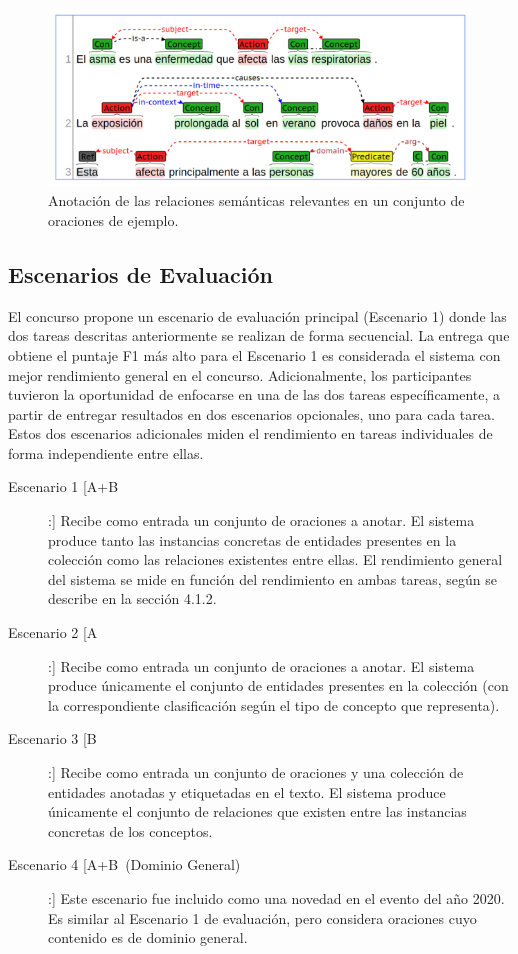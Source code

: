 \begin{figure}[h!]
	\centering
	\includegraphics[width=0.9\linewidth]{Graphics/relations.png}
	\caption{Anotación de las relaciones semánticas relevantes en un conjunto de oraciones de ejemplo.} \label{fig:relations_ex}
\end{figure}


\subsection{Escenarios de Evaluación}\label{subsec:eval_sce}

El concurso propone un escenario de evaluación principal (Escenario 1) donde las dos tareas descritas anteriormente se realizan de forma secuencial.
La entrega que obtiene el puntaje F1 más alto para el Escenario 1 es
considerada el sistema con mejor rendimiento general en el concurso.
Adicionalmente, los participantes tuvieron la oportunidad de enfocarse en una de las dos tareas específicamente, a partir de entregar resultados en dos escenarios opcionales, uno para cada tarea.
Estos dos escenarios adicionales miden el rendimiento en tareas individuales de forma independiente entre ellas.

\begin{description}
	
\item[Escenario 1 [A+B]:] Recibe como entrada un conjunto de oraciones a anotar.
El sistema produce tanto las instancias concretas de entidades
presentes en la colección como las relaciones existentes entre ellas.
El rendimiento general del sistema se mide en función
del rendimiento en ambas tareas, según se describe en la sección 4.1.2.
 
\item[Escenario 2 [A]:] Recibe como entrada un conjunto de oraciones a anotar.
El sistema produce únicamente el conjunto de entidades presentes en la colección (con la correspondiente clasificación según el tipo de concepto que representa).

\item[Escenario 3 [B]:] Recibe como entrada un conjunto de oraciones y una colección de entidades anotadas y etiquetadas en el texto.
El sistema produce únicamente el conjunto de relaciones que existen entre las instancias concretas de los conceptos.

\item[Escenario 4 [A+B~(Dominio General)]:] Este escenario fue incluido como una novedad en el evento del año 2020.
Es similar al Escenario 1 de evaluación, pero considera oraciones cuyo contenido es de dominio general.

\end{description} 


